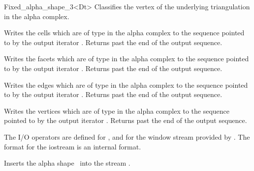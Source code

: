 \begin{ccRefClass} {Fixed_alpha_shape_3<Dt>}
{Classifies the vertex  of the underlying triangulation in the alpha complex.}



{Writes the cells which are of type  in the alpha complex
to the sequence
pointed to by the output iterator . Returns past the end
of the output sequence.}


{Writes the facets which are of type  in the alpha complex
to the sequence pointed to by the output iterator . Returns past the end
of the output sequence.}

{Writes the edges which are of type  in the alpha complex 
to the sequence
pointed to by the output iterator . Returns past the end
of the output sequence.}

{Writes the vertices which are of type  in the alpha complex
to the sequence pointed to by the output iterator . Returns past the end
of the output sequence.}


The I/O operators are defined for , and for
the window stream provided by \cgal. The format for the iostream
is an internal format. 


{Inserts the alpha shape \ccVar\ into the stream .
}



\end{ccRefClass}

